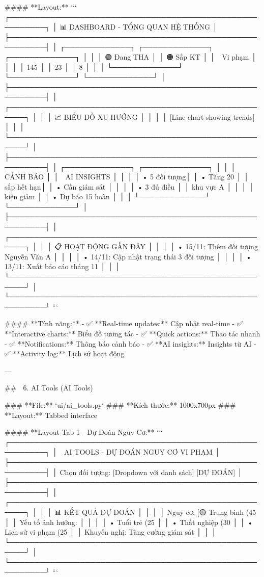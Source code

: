 #### **Layout:**
```
┌─────────────────────────────────────────────────────────┐
│ 📊 DASHBOARD - TỔNG QUAN HỆ THỐNG                     │
├─────────────────────────────────────────────────────────┤
│ ┌─────────────┐ ┌─────────────┐ ┌─────────────┐       │
│ │ 🟢 Đang THA │ │ 🟠 Sắp KT   │ │ 🔴 Vi phạm │       │
│ │    145      │ │     23      │ │     8       │       │
│ └─────────────┘ └─────────────┘ └─────────────┘       │
├─────────────────────────────────────────────────────────┤
│ ┌─────────────────────────────────────────────────────┐ │
│ │ 📈 BIỂU ĐỒ XU HƯỚNG                               │ │
│ │ [Line chart showing trends]                        │ │
│ └─────────────────────────────────────────────────────┘ │
├─────────────────────────────────────────────────────────┤
│ ┌─────────────┐ ┌─────────────┐                       │
│ │ 🚨 CẢNH BÁO │ │ 🤖 AI INSIGHTS │                    │
│ │ • 5 đối tượng│ │ • Tăng 20%
│ │   sắp hết hạn│ │ • Cần giám sát    │                │
│ │ • 3 đủ điều │ │   khu vực A      │                │
│ │   kiện giảm │ │ • Dự báo 15 hoàn │                │
│ └─────────────┘ └─────────────┘                       │
├─────────────────────────────────────────────────────────┤
│ ┌─────────────────────────────────────────────────────┐ │
│ │ 📋 HOẠT ĐỘNG GẦN ĐÂY                               │ │
│ │ • 15/11: Thêm đối tượng Nguyễn Văn A              │ │
│ │ • 14/11: Cập nhật trạng thái 3 đối tượng          │ │
│ │ • 13/11: Xuất báo cáo tháng 11                    │ │
│ └─────────────────────────────────────────────────────┘ │
└─────────────────────────────────────────────────────────┘
```

#### **Tính năng:**
- ✅ **Real-time updates:** Cập nhật real-time
- ✅ **Interactive charts:** Biểu đồ tương tác
- ✅ **Quick actions:** Thao tác nhanh
- ✅ **Notifications:** Thông báo cảnh báo
- ✅ **AI insights:** Insights từ AI
- ✅ **Activity log:** Lịch sử hoạt động

---

## 🤖 6. AI Tools (AI Tools)

### **File:** `ui/ai_tools.py`
### **Kích thước:** 1000x700px
### **Layout:** Tabbed interface

#### **Layout Tab 1 - Dự Đoán Nguy Cơ:**
```
┌─────────────────────────────────────────────────────────┐
│ 🤖 AI TOOLS - DỰ ĐOÁN NGUY CƠ VI PHẠM                │
├─────────────────────────────────────────────────────────┤
│ Chọn đối tượng: [Dropdown với danh sách] [DỰ ĐOÁN]   │
├─────────────────────────────────────────────────────────┤
│ ┌─────────────────────────────────────────────────────┐ │
│ │ 📊 KẾT QUẢ DỰ ĐOÁN                                │ │
│ │ Nguy cơ: [🟡 Trung bình (45%
│ │ Yếu tố ảnh hưởng:                                 │ │
│ │ • Tuổi trẻ (25%
│ │ • Thất nghiệp (30%
│ │ • Lịch sử vi phạm (25%
│ │ Khuyến nghị: Tăng cường giám sát                  │ │
│ └─────────────────────────────────────────────────────┘ │
└─────────────────────────────────────────────────────────┘
```

